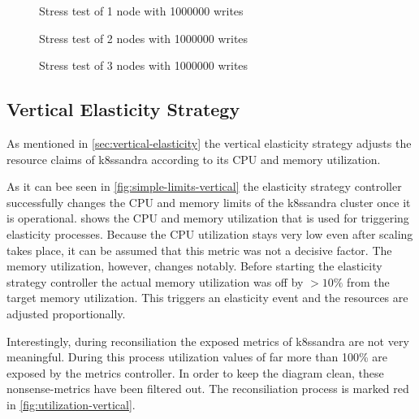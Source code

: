 \begin{figure}
    \centering
    
    \caption{Stress test of 1 node with 1000000 writes}
    \label{fig:stress-1000000writes-1node}
\end{figure}

\begin{figure}
    \centering
    
    \caption{Stress test of 2 nodes with 1000000 writes}
    \label{fig:stress-1000000writes-2node}
\end{figure}

\begin{figure}
    \centering
    
    \caption{Stress test of 3 nodes with 1000000 writes}
    \label{fig:stress-1000000writes-3node}
\end{figure}

\subsection{Vertical Elasticity Strategy}
\label{sec:evaluation-vertical-elasticity}

As mentioned in \cref{sec:vertical-elasticity} the vertical elasticity strategy adjusts the resource claims of k8ssandra according to its CPU and memory utilization.

As it can bee seen in \cref{fig:simple-limits-vertical} the elasticity strategy controller successfully changes the CPU and memory limits of the k8ssandra cluster once it is operational.  shows the CPU and memory utilization that is used for triggering elasticity processes. Because the CPU utilization stays very low even after scaling takes place, it can be assumed that this metric was not a decisive factor. The memory utilization, however, changes notably. Before starting the elasticity strategy controller the actual memory utilization was off by \(>10\%\) from the target memory utilization. This triggers an elasticity event and the resources are adjusted proportionally.

Interestingly, during reconsiliation the exposed metrics of k8ssandra are not very meaningful. During this process utilization values of far more than 100\% are exposed by the metrics controller. In order to keep the diagram clean, these nonsense-metrics have been filtered out. The reconsiliation process is marked red in \cref{fig:utilization-vertical}.

